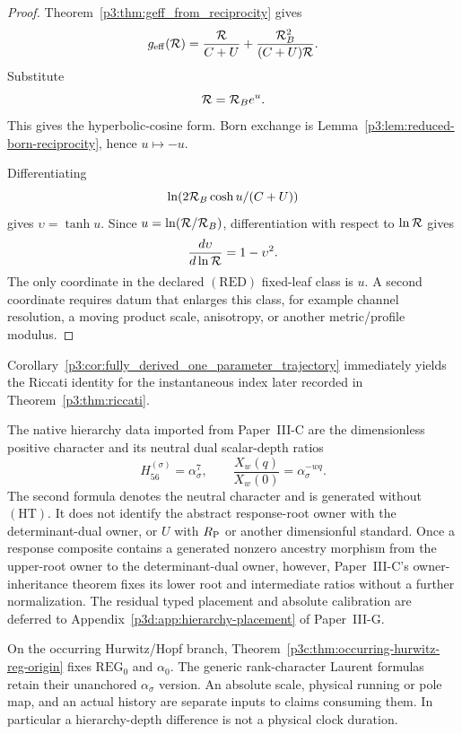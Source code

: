 \documentclass[12pt,a4paper]{article}
\begin{document}
\begin{proof}
Theorem~\ref{p3:thm:geff_from_reciprocity} gives
\[
 g_{\mathrm{eff}}(\mathcal R)
 =\frac{\mathcal R}{C+U}+\frac{\mathcal R_B^2}{(C+U)\mathcal R}.
\]
Substitute
\[
  \mathcal R=\mathcal R_B e^u .
\]
This gives the hyperbolic-cosine form.  Born exchange is
Lemma~\ref{p3:lem:reduced-born-reciprocity}, hence \(u\mapsto -u\).

Differentiating
\[
  \ln(2\mathcal R_B\cosh u/(C+U))
\]
gives \(\upsilon=\tanh u\).  Since \(u=\ln(\mathcal R/\mathcal R_B)\), differentiation
with respect to \(\ln\mathcal R\) gives
\[
  \frac{d\upsilon}{d\ln\mathcal R}=1-\upsilon^2.
\]
The only coordinate in the declared \((\mathrm{RED})\) fixed-leaf class is
\(u\).  A second coordinate requires datum that enlarges this class, for
example channel resolution, a moving product scale, anisotropy, or another
metric/profile modulus.
\end{proof}

\begin{remark}
\label{p3:rem:riccati_from_geff}
Corollary~\ref{p3:cor:fully_derived_one_parameter_trajectory} immediately yields the Riccati identity for the instantaneous index later recorded in Theorem~\ref{p3:thm:riccati}.
\end{remark}


\begin{remark}
\label{p3d:rem:dimensionless-hierarchy-handoff}
The native hierarchy data imported from Paper~III-C are the dimensionless
positive character and its neutral dual scalar-depth ratios
\[
 H_{56}^{(\sigma)}=\alpha_\sigma^{7},
 \qquad
 \frac{X_w(q)}{X_w(0)}=\alpha_\sigma^{-wq}.
\]
The second formula denotes the neutral character and is generated without
\((\mathrm{HT})\).  It does not identify the abstract response-root owner
with the determinant-dual owner, or \(U\) with \(R_{\mathrm P}\) or another
dimensionful standard.  Once a response composite contains a generated
nonzero ancestry morphism from the upper-root owner to the determinant-dual
owner, however, Paper~III-C's owner-inheritance theorem fixes its lower root
and intermediate ratios without a further normalization.  The residual
typed placement and absolute calibration are
deferred to Appendix~\ref{p3d:app:hierarchy-placement} of Paper~III-G.
\end{remark}

\begin{remark}
\label{p3d:rem:anchored-reg-hierarchy-import}
On the occurring Hurwitz/Hopf branch,
Theorem~\ref{p3c:thm:occurring-hurwitz-reg-origin} fixes
\(\mathrm{REG}_0\) and \(\alpha_0\).  The generic
rank-character Laurent formulas retain their unanchored
\(\alpha_\sigma\) version.  An absolute scale, physical
running or pole map, and an actual history are separate
inputs to claims consuming them.  In particular a
hierarchy-depth difference is not a physical clock duration.
\end{remark}
\end{document}
